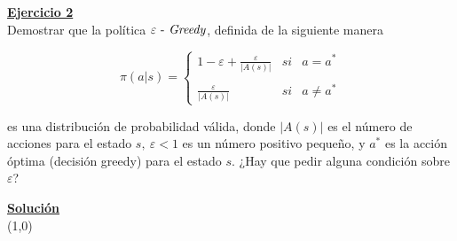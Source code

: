 \indent\underline{\textbf{Ejercicio 2}}\\
Demostrar que la política $\varepsilon \text{ - \textit{Greedy}}$, definida de la siguiente manera

\begin{equation}
\pi(a|s) = \left\{
\begin{array}{lcc}
    1 - \varepsilon + \frac{\varepsilon}{|A(s)|} & si  & a = a^{\ast} \\ \\
     \frac{\varepsilon}{|A(s)|} &  si & a \neq a^{\ast}
\end{array}
   \right.\label{eq:equation}
\end{equation}

es una distribución de probabilidad válida, donde $|A(s)|$ es el número de acciones para el estado $s, \ \varepsilon < 1$ es un número positivo pequeño, y $a^{\ast}$ es la acción óptima (decisión greedy) para el estado $s$.
¿Hay que pedir alguna condición sobre $\varepsilon$?

\indent\underline{\textbf{Solución}}\\

\line(1,0){\textwidth}

